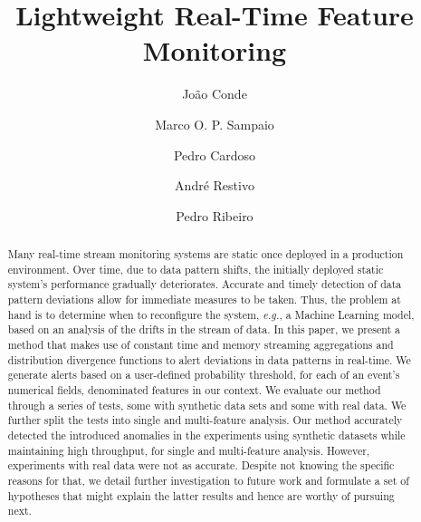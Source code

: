 \documentclass[sigconf]{acmart}
\begin{document}
%
\title{Lightweight Real-Time Feature Monitoring}

%
\author[Conde]{João Conde}

\author[Sampaio]{Marco O. P. Sampaio}

\author[Cardoso]{Pedro Cardoso}

\author[Restivo]{André Restivo}

\author[Ribeiro]{Pedro Ribeiro}


    


%

%
\begin{abstract}
Many real-time stream monitoring systems are static once deployed in a production environment. Over time, due to data pattern shifts, the initially deployed static system's performance gradually deteriorates. Accurate and timely detection of data pattern deviations allow for immediate measures to be taken. Thus, the problem at hand is to determine when to reconfigure the system, \textit{e.g.}, a Machine Learning model, based on an analysis of the drifts in the stream of data. In this paper, we present a method that makes use of constant time and memory streaming aggregations and distribution divergence functions to alert deviations in data patterns in real-time. We generate alerts based on a user-defined probability threshold, for each of an event's numerical fields, denominated features in our context. We evaluate our method through a series of tests, some with synthetic data sets and some with real data. We further split the tests into single and multi-feature analysis. Our method accurately detected the introduced anomalies in the experiments using synthetic datasets while maintaining high throughput, for single and multi-feature analysis. However, experiments with real data were not as accurate. Despite not knowing the specific reasons for that, we detail further investigation to future work and formulate a set of hypotheses that might explain the latter results and hence are worthy of pursuing next.
\end{abstract}
\end{document}
